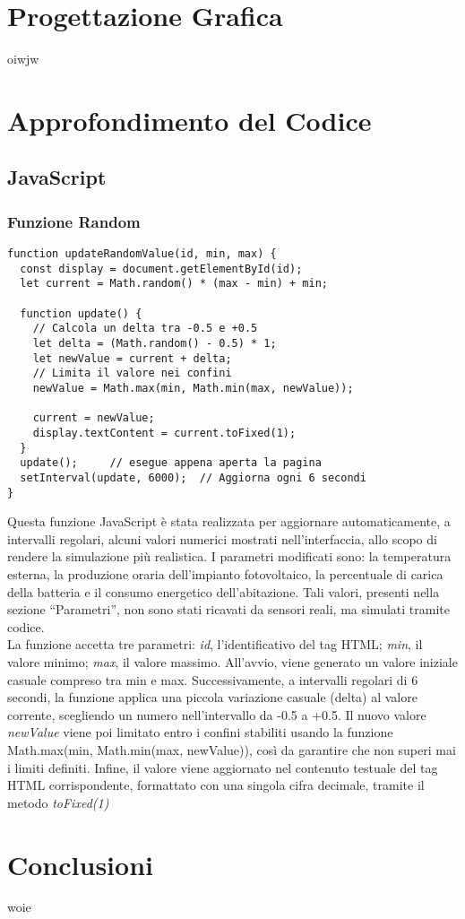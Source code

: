 \documentclass[italian, 12pt, a4paper]{article}
\begin{document}
\section{Progettazione Grafica}\label{sec:progettazione}
oiwjw
\clearpage
\section{Approfondimento del Codice}\label{sec:codice}
\subsection{JavaScript}
\subsubsection{Funzione Random}
\begin{lstlisting}[caption={Funzione Random}, label={lst:funzioneJS}]
function updateRandomValue(id, min, max) {
  const display = document.getElementById(id);
  let current = Math.random() * (max - min) + min;

  function update() {
    // Calcola un delta tra -0.5 e +0.5
    let delta = (Math.random() - 0.5) * 1;
    let newValue = current + delta;
    // Limita il valore nei confini
    newValue = Math.max(min, Math.min(max, newValue));  

    current = newValue;
    display.textContent = current.toFixed(1);
  }
  update();     // esegue appena aperta la pagina
  setInterval(update, 6000);  // Aggiorna ogni 6 secondi
}
\end{lstlisting}
Questa funzione JavaScript è stata realizzata per aggiornare automaticamente, a intervalli regolari, alcuni valori numerici mostrati nell’interfaccia, allo scopo di rendere la simulazione più realistica. I parametri modificati sono: la temperatura esterna, la produzione oraria dell’impianto fotovoltaico, la percentuale di carica della batteria e il consumo energetico dell’abitazione. Tali valori, presenti nella sezione “Parametri”, non sono stati ricavati da sensori reali, ma simulati tramite codice.\\La funzione accetta tre parametri: \emph{id}, l’identificativo del tag HTML; \emph{min}, il valore minimo; \emph{max}, il valore massimo. All’avvio, viene generato un valore iniziale casuale compreso tra min e max. Successivamente, a intervalli regolari di 6 secondi, la funzione applica una piccola variazione casuale (delta) al valore corrente, scegliendo un numero nell'intervallo da -0.5 a +0.5. Il nuovo valore \emph{newValue} viene poi limitato entro i confini stabiliti usando la funzione Math.max(min, Math.min(max, newValue)), così da garantire che non superi mai i limiti definiti. Infine, il valore viene aggiornato nel contenuto testuale del tag HTML corrispondente, formattato con una singola cifra decimale, tramite il metodo \emph{toFixed(1)}
\clearpage
\section{Conclusioni}\label{sec:conclusioni}
woie
\end{document}
